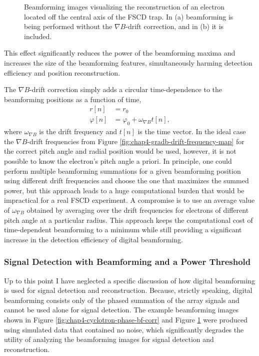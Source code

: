\begin{figure}[htbp]
\begin{subfigure}{0.45\textwidth}
        \caption{}
    \end{subfigure}
    \caption{Beamforming images visualizing the reconstruction of an electron located off the central axis of the FSCD trap. In (a) beamforming is being performed without the $\nabla B$-drift correction, and in (b) it is included.}
    \label{fig:chap4-gradb-bf-drift-corr}
\end{figure}
This effect significantly reduces the power of the beamforming maxima and increases the size of the beamforming features, simultaneously harming detection efficiency and position reconstruction. 

The $\nabla B$-drift correction simply adds a circular time-dependence to the beamforming positions as a function of time,
\begin{align}
    r[n]&=r_0\\
    \varphi[n]&=\varphi_0 + \omega_{\nabla B}t[n],
    \label{eq:chap4-grab-b-drift}
\end{align}
where $\omega_{\nabla B}$ is the drift frequency and $t[n]$ is the time vector. In the ideal case the $\nabla B$-drift frequencies from Figure \ref{fig:chap4-gradb-drift-frequency-map} for the correct pitch angle and radial position would be used, however, it is not possible to know the electron's pitch angle a priori. In principle, one could perform multiple beamforming summations for a given beamforming position using different drift frequencies and choose the one that maximizes the summed power, but this approach leads to a huge computational burden that would be impractical for a real FSCD experiment. A compromise is to use an average value of $\omega_{\nabla B}$ obtained by averaging over the drift frequencies for electrons of different pitch angle at a particular radius. This approach keeps the computational cost of time-dependent beamforming to a minimum while still providing a significant increase in the detection efficiency of digital beamforming.

\subsubsection*{Signal Detection with Beamforming and a Power Threshold}

Up to this point I have neglected a specific discussion of how digital beamforming is used for signal detection and reconstruction. Because, strictly speaking, digital beamforming consists only of the phased summation of the array signals and cannot be used alone for signal detection. The example beamforming images shown in Figure \ref{fig:chap4-cyclotron-phase-bf-corr} and Figure \ref{fig:chap4-gradb-bf-drift-corr} were produced using simulated data that contained no noise, which significantly degrades the utility of analyzing the beamforming images for signal detection and reconstruction. 

